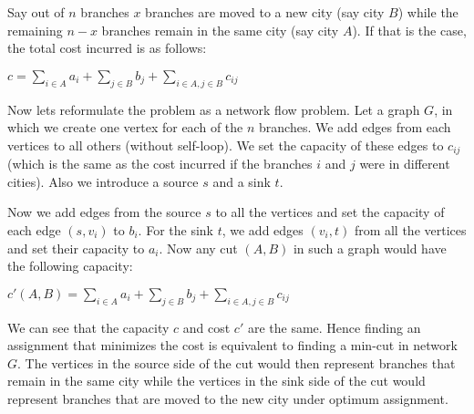 Say out of $n$ branches $x$ branches are moved to a new city (say city $B$) while the remaining $n-x$ branches remain in the same city (say city $A$). If that is the case, the total cost incurred is as follows:

\begin{center}
$c = \sum\limits_{i \in A} a_i + \sum\limits_{j \in B} b_j + \sum\limits_{i \in A, j \in B} c_{ij} $
\end{center}

Now lets reformulate the problem as a network flow problem. Let a graph $G$, in which we create one vertex for each of the  $n$ branches. We add edges from each vertices to all others (without self-loop). We set the capacity of these edges to $c_{ij}$ (which is the same as the cost incurred if the branches $i$ and $j$ were in different cities). Also we introduce a source $s$ and a sink $t$.

Now we add edges from the source $s$ to all the vertices and set the capacity of each edge $(s, v_i)$ to $b_i$. For the sink $t$, we add edges $(v_i, t)$ from all the vertices and set their capacity to $a_i$. Now any cut $(A, B)$ in such a graph would have the following capacity:

\begin{center}
$c'(A, B) = \sum\limits_{i \in A} a_i + \sum\limits_{j \in B} b_j + \sum\limits_{i \in A, j \in B} c_{ij} $
\end{center}

We can see that the capacity $c$ and cost $c'$ are the same. Hence finding an assignment that minimizes the cost is equivalent to finding a min-cut in network $G$. The vertices in the source side of the cut would then represent branches that remain in the same city while the vertices in the sink side of the cut would represent branches that are moved to the new city under optimum assignment.
